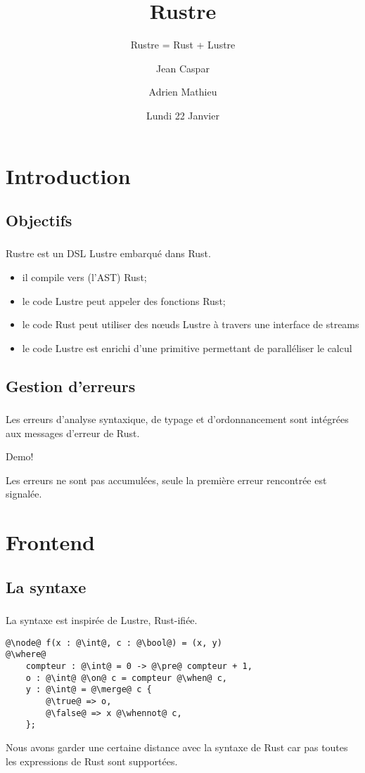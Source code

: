 \documentclass[professionalfonts]{beamer}
\title{Rustre}
\subtitle{Rustre = Rust + Lustre}
\author[J. Caspar \and A. Mathieu]{Jean Caspar \and Adrien Mathieu}
\date{Lundi 22 Janvier}
\makeatletter
\newcommand*{\currentname}{\@currentlabelname}
\makeatother
\begin{document}
\begingroup
{}
\begin{frame}[noframenumbering]
  \titlepage
\end{frame}
\endgroup

\section{Introduction}
\subsection{Objectifs}
\begin{frame}
  \frametitle{\currentname}

  Rustre est un DSL Lustre embarqué dans Rust.\pause
  \begin{itemize}
  \item il compile vers (l'AST) Rust;
    \pause
  \item le code Lustre peut appeler des fonctions Rust;
    \pause
  \item le code Rust peut utiliser des nœuds Lustre à travers une interface de streams
    \pause
  \item le code Lustre est enrichi d'une primitive permettant de paralléliser le calcul
  \end{itemize}
\end{frame}

\subsection{Gestion d'erreurs}
\begin{frame}
  \frametitle{\currentname}

  Les erreurs d'analyse syntaxique, de typage et d'ordonnancement sont intégrées aux messages
  d'erreur de Rust.\pause
  \begin{center}
    Demo! %
  \end{center}
  \pause
  Les erreurs ne sont pas accumulées, seule la première erreur rencontrée est signalée.
\end{frame}

\section{Frontend}
\subsection{La syntaxe}
\begin{frame}[fragile]
  \frametitle{\currentname}

  La syntaxe est inspirée de Lustre, Rust-ifiée.\pause
  \begin{verbatim}
@\node@ f(x : @\int@, c : @\bool@) = (x, y)
@\where@
    compteur : @\int@ = 0 -> @\pre@ compteur + 1,
    o : @\int@ @\on@ c = compteur @\when@ c,
    y : @\int@ = @\merge@ c {
        @\true@ => o,
        @\false@ => x @\whennot@ c,
    };
  \end{verbatim}
  \pause Nous avons garder une certaine distance avec la syntaxe de Rust car pas toutes les
  expressions de Rust sont supportées.
\end{frame}
\end{document}
